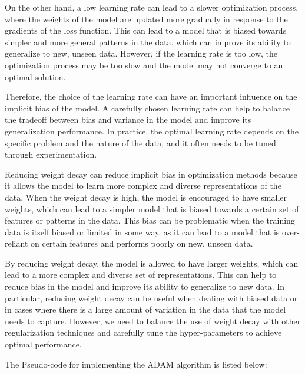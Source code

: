 On the other hand, a low learning rate can lead to a slower optimization process, where the weights of the model are updated more gradually in response to the gradients of the loss function. This can lead to a model that is biased towards simpler and more general patterns in the data, which can improve its ability to generalize to new, unseen data. However, if the learning rate is too low, the optimization process may be too slow and the model may not converge to an optimal solution. 

Therefore, the choice of the learning rate can have an important influence on the implicit bias of the model. A carefully chosen learning rate can help to balance the tradeoff between bias and variance in the model and improve its generalization performance. In practice, the optimal learning rate depends on the specific problem and the nature of the data, and it often needs to be tuned through experimentation.

Reducing weight decay can reduce implicit bias in optimization methods because it allows the model to learn more complex and diverse representations of the data. When the weight decay is high, the model is encouraged to have smaller weights, which can lead to a simpler model that is biased towards a certain set of features or patterns in the data. This bias can be problematic when the training data is itself biased or limited in some way, as it can lead to a model that is over-reliant on certain features and performs poorly on new, unseen data.

By reducing weight decay, the model is allowed to have larger weights, which can lead to a more complex and diverse set of representations. This can help to reduce bias in the model and improve its ability to generalize to new data. In particular, reducing weight decay can be useful when dealing with biased data or in cases where there is a large amount of variation in the data that the model needs to capture. However, we need to balance the use of weight decay with other regularization techniques and carefully tune the hyper-parameters to achieve optimal performance.

The Pseudo-code for implementing the ADAM algorithm is listed below:

